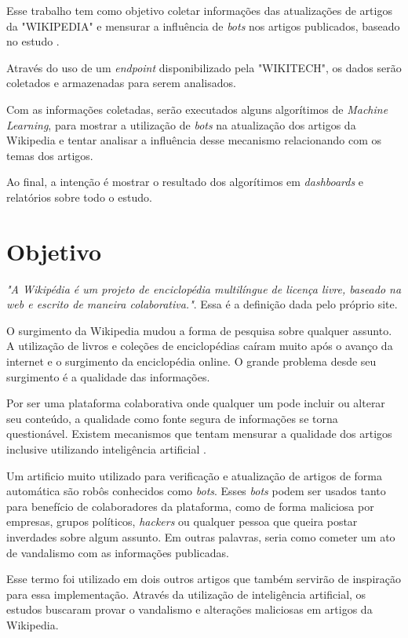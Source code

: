 \documentclass[a4paper, 12pt]{article}
\begin{document}
Esse trabalho tem como objetivo coletar informações das atualizações de artigos da "WIKIPEDIA"\cite{Wiki} e mensurar a influência de \textit{bots} nos artigos publicados, baseado no estudo \cite{art3}.

Através do uso de um \textit{endpoint} disponibilizado pela "WIKITECH"\cite{Wikitech}, os dados serão coletados e armazenadas para serem analisados.

Com as informações coletadas, serão executados alguns algorítimos de \textit{Machine Learning}, para mostrar a utilização de \textit{bots} na atualização dos artigos da Wikipedia e tentar analisar a influência desse mecanismo relacionando com os temas dos artigos.

Ao final, a intenção é mostrar o resultado dos algorítimos em \textit{dashboards} e relatórios sobre todo o estudo.

\newpage

\section{Objetivo}

\textit{"A Wikipédia é um projeto de enciclopédia multilíngue de licença livre, baseado na web e escrito de maneira colaborativa."}.
Essa é a definição dada pelo próprio site\cite{Wiki}.

O surgimento da Wikipedia mudou a forma de pesquisa sobre qualquer assunto. A utilização de livros e coleções de enciclopédias caíram muito após o avanço da internet e o surgimento da enciclopédia online. O grande problema desde seu surgimento é a qualidade das informações.

Por ser uma plataforma colaborativa onde qualquer um pode incluir ou alterar seu conteúdo, a qualidade como fonte segura de informações se torna questionável. Existem mecanismos que tentam mensurar a qualidade dos artigos \cite{art1} inclusive utilizando inteligência artificial \cite{art2}.

Um artificio muito utilizado para verificação e atualização de artigos de forma automática são robôs conhecidos como \textit{bots}. Esses \textit{bots} podem ser usados tanto para benefício de colaboradores da plataforma, como de forma maliciosa por empresas, grupos políticos, \textit{hackers} ou qualquer pessoa que queira postar inverdades sobre algum assunto. Em outras palavras, seria como cometer um ato de vandalismo com as informações publicadas.

Esse termo foi utilizado em dois outros artigos que também servirão de inspiração para essa implementação\cite{art4}\cite{art5}. Através da utilização de inteligência artificial, os estudos buscaram provar o vandalismo e alterações maliciosas em artigos da Wikipedia.
\end{document}
